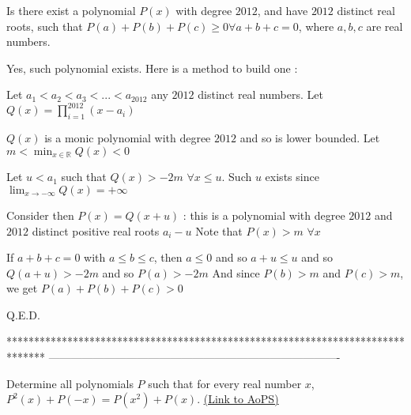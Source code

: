 \begin{solution}
	\begin{tcolorbox}Is there exist a polynomial $P(x)$ with degree $2012$, and have $2012$ distinct real roots, such that $P(a) + P(b) + P(c) \ge 0 \forall a + b + c = 0 $, where   $a, b, c$ are real numbers.\end{tcolorbox}
Yes, such polynomial exists. Here is a method to build one :

Let $a_1<a_2<a_3< ... <a_{2012}$ any $2012$ distinct real numbers.
Let $Q(x)=\prod_{i=1}^{2012}(x-a_i)$

$Q(x)$ is a monic polynomial with degree $2012$ and so is lower bounded. Let $m<\min_{x\in\mathbb R}Q(x)<0$

Let $u<a_1$ such that $Q(x)>-2m$ $\forall x\le u$. Such $u$ exists since $\lim_{x\to -\infty}Q(x)=+\infty$

Consider then $P(x)=Q(x+u)$ : this is a polynomial with degree $2012$ and $2012$ distinct positive real roots $a_i-u$
Note that $P(x)>m$ $\forall x$

If $a+b+c=0$ with $a\le b\le c$, then $a\le 0$ and so $a+u\le u$ and so $Q(a+u)>-2m$ and so $P(a)>-2m$
And since $P(b)>m$ and $P(c)>m$, we get $P(a)+P(b)+P(c)>0$

Q.E.D.
\end{solution}
*******************************************************************************
-------------------------------------------------------------------------------

\begin{problem}
	Determine all polynomials $P$ such that for every real number $x$,  $P^2(x)+P(-x)=P(x^2)+P(x)$.
	\flushright \href{https://artofproblemsolving.com/community/c6h544713}{(Link to AoPS)}
\end{problem}



